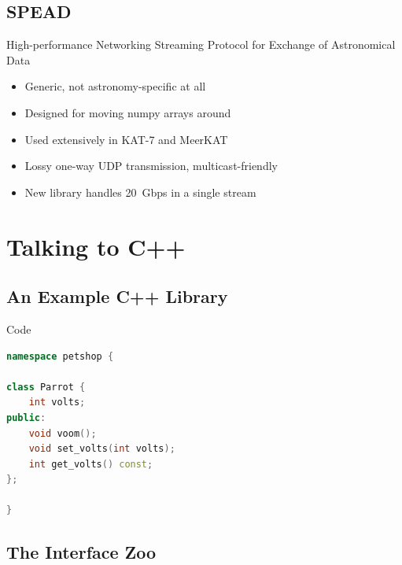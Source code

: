 \documentclass{beamer}
\begin{document}
\subsection{SPEAD}

\begin{frame}{High-performance Networking}
  \alert{S}treaming \alert{P}rotocol for \alert{E}xchange of
  \alert{A}stronomical \alert{D}ata
  \begin{itemize}
    \item Generic, not astronomy-specific at all
    \item Designed for moving numpy arrays around
    \item Used extensively in KAT-7 and MeerKAT
    \item Lossy one-way UDP transmission, multicast-friendly
    \item New library handles \SI{20}{Gbps} in a single stream
  \end{itemize}
\end{frame}

\section{Talking to C++}

\subsection{An Example C++ Library}

\begin{frame}[fragile=singleslide]{Code}
\begin{lstlisting}[language=c++]
namespace petshop {

class Parrot {
    int volts;
public:
    void voom();
    void set_volts(int volts);
    int get_volts() const;
};

}
\end{lstlisting}
\end{frame}

\subsection{The Interface Zoo}
\end{document}

